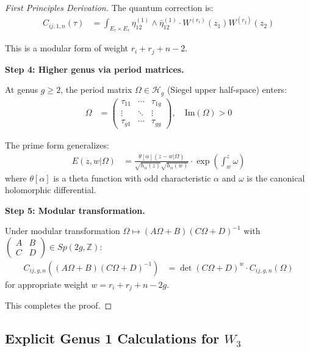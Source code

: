 \begin{proof}[First Principles Derivation]
The quantum correction is:
\begin{align}
C_{ij,1,n}(\tau) &= \int_{E_\tau \times E_\tau} \eta_{12}^{(1)} \wedge \bar{\eta}_{12}^{(1)} \cdot W^{(r_i)}(z_1) W^{(r_j)}(z_2)
\end{align}

This is a modular form of weight $r_i + r_j + n - 2$.

\textbf{Step 4: Higher genus via period matrices.}

At genus $g \geq 2$, the period matrix $\Omega \in \mathcal{H}_g$ (Siegel upper half-space) enters:
\begin{align}
\Omega &= \begin{pmatrix} \tau_{11} & \cdots & \tau_{1g} \\ \vdots & \ddots & \vdots \\ \tau_{g1} & \cdots & \tau_{gg} \end{pmatrix}, \quad \text{Im}(\Omega) > 0
\end{align}

The prime form generalizes:
\begin{align}
E(z,w|\Omega) &= \frac{\theta[\alpha](z-w|\Omega)}{\sqrt{h_\alpha(z)} \sqrt{h_\alpha(w)}} \cdot \exp\left(\int_w^z \omega\right)
\end{align}
where $\theta[\alpha]$ is a theta function with odd characteristic $\alpha$ and $\omega$ is the 
canonical holomorphic differential.

\textbf{Step 5: Modular transformation.}

Under modular transformation $\Omega \mapsto (A\Omega + B)(C\Omega + D)^{-1}$ with 
$\begin{pmatrix} A & B \\ C & D \end{pmatrix} \in Sp(2g,\mathbb{Z})$:
\begin{align}
C_{ij,g,n}((A\Omega + B)(C\Omega + D)^{-1}) &= \det(C\Omega + D)^{w} \cdot C_{ij,g,n}(\Omega)
\end{align}
for appropriate weight $w = r_i + r_j + n - 2g$.

This completes the proof.
\end{proof}

\subsection{Explicit Genus 1 Calculations for $W_3$}

